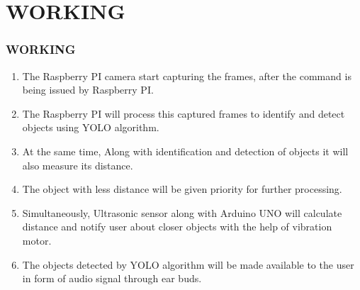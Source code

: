 \documentclass[
	11pt, %
	t, %
	aspectratio=169, %
]{beamer}
\begin{document}
\section{WORKING}
\begin{frame}
	\frametitle{WORKING}
	\begin{enumerate}
	\item The Raspberry PI camera start capturing the frames, after the command is being issued by Raspberry PI.
	\item The Raspberry PI will process this captured frames to identify and detect objects using YOLO algorithm.
	\item At the same time, Along with identification and detection of objects it will also measure its distance. 
	\item The object with less distance will be given priority for further processing.
	\item Simultaneously, Ultrasonic sensor along with Arduino UNO will calculate distance and notify user about closer objects with the help of vibration motor.
	\item The objects detected by YOLO algorithm will be made available to the user in form of audio signal through ear buds.
	\end{enumerate}
\end{frame}
\end{document}
